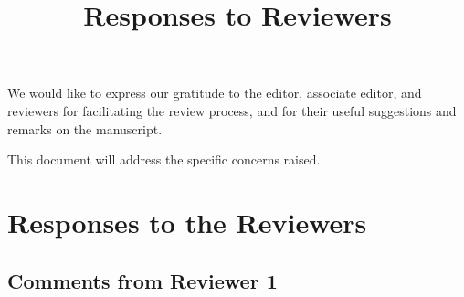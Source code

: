 \documentclass{article}
\title{Responses to Reviewers}
\author{}
\date{}
\begin{document}
\maketitle

We would like to express our gratitude to the editor, associate editor, and reviewers for facilitating the review process, and for their useful suggestions and remarks on the manuscript.

This document will address the specific concerns raised.

\section{Responses to the Reviewers}

\subsection{Comments from Reviewer 1}
\end{document}
